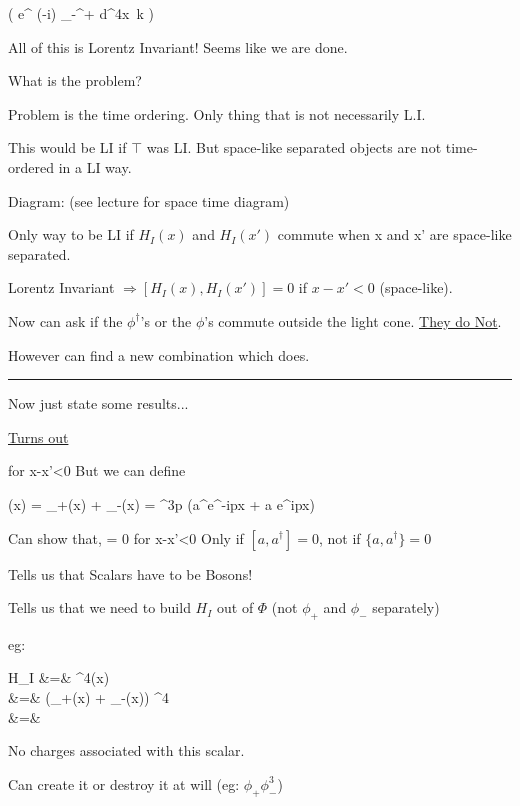 {\be
\top\left( e^{ (-i) \int_{-\infty}^{+\infty} d^4x\ k } \right)
\ee

All of this is Lorentz Invariant!
Seems like we are done.

What is the problem?

Problem is the time ordering.  
Only thing that is not necessarily L.I.

This would be LI if $\top$ was LI. 
But space-like separated objects are not time-ordered in a LI way. 

Diagram:  (see lecture for space time diagram)


Only way to be LI if $H_I(x)$ and $H_I(x')$ commute when x and x' are space-like separated.

Lorentz Invariant $\Rightarrow [H_I(x), H_I(x')] = 0$  if $x-x' < 0$ (space-like). 

Now can ask if the $\phi^\dagger$'s or the $\phi$'s commute outside the light cone.  
\underline{They do Not}. 

However can find a new combination which does.

\noindent\rule{\textwidth}{1pt}

Now just state some results...

\underline{Turns out} 

  \textrm{ for } x-x'<0
\ee
But we can define 

\be
\Phi(x) = \phi_+(x) + \phi_-(x) = \int {}^3p (a^\dagger e^{-ipx} + a e^{ipx})
\ee

Can show that,
 = 0 \textrm{ for } x-x'<0
\ee
Only if $[a,a^\dagger] = 0$, not if $\{a,a^\dagger\} = 0$

Tells us that Scalars have to be Bosons!

Tells us that we need to build $H_I$ out of $\Phi$ (not $\phi_+$ and $\phi_-$ separately)

eg: 

\bea
H_I &=& \lambda \Phi^4(x)\\
    &=& \lambda (\phi_+(x) + \phi_-(x)) ^4\\
    &=& \lambda {} 
\eea


No charges associated with this scalar. 


Can create it or destroy it at will (eg: $\phi_+\phi_-^3$)

}
